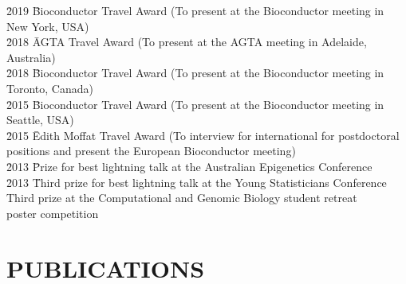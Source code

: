 \documentclass[11pt,letterpaper,pdf]{article}
\begin{document}
\begin{tabbing}
  \= 2019 \hspace*{0.5cm} \= Bioconductor Travel Award (To present at the Bioconductor meeting in New York, USA)\\
  \= 2018 \hspace*{0.5cm} \= AGTA Travel Award (To present at the AGTA meeting in Adelaide, Australia)\\
  \= 2018 \hspace*{0.5cm} \= Bioconductor Travel Award (To present at the Bioconductor meeting in Toronto, Canada)\\
  \= 2015 \hspace*{0.5cm} \= Bioconductor Travel Award (To present at the Bioconductor meeting in Seattle, USA)\\
  \= 2015 \hspace*{0.5cm} \= Edith Moffat Travel Award (To interview for international for postdoctoral positions and present the European Bioconductor meeting)\\
  \= 2013 \hspace*{0.5cm} \= Prize for best lightning talk at the Australian Epigenetics Conference\\
  \= 2013 \hspace*{0.5cm} \= Third prize for best lightning talk at the Young Statisticians Conference\\
   \> Third prize at the Computational and Genomic Biology student retreat \\
  \>\>poster competition \\
\end{tabbing}

\section*{PUBLICATIONS}

\nocite{*}


\printbibliography[title=Journal Articles (peer reviewed),keyword=peerjournal,prenote=mynote]

\printbibliography[title={Journal Articles, Consortia member (peer reviewed)},keyword=peerconsortia]
\end{document}
